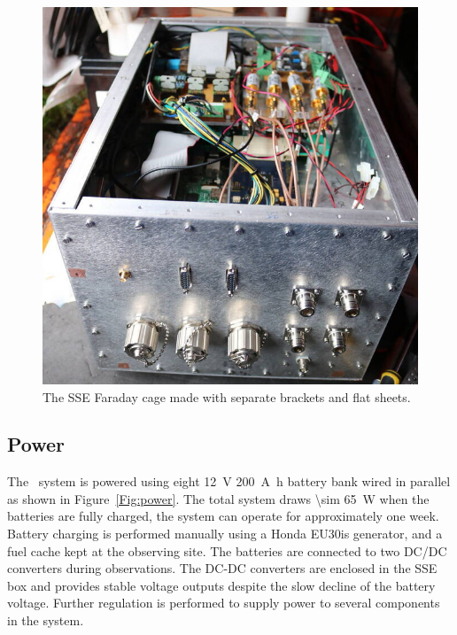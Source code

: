\begin{figure}
	\centering
	\includegraphics[width=0.4\linewidth]{Figures/47093285614_63bb00be20_o}
	\caption{The SSE Faraday cage made with separate brackets and flat sheets.}
	\label{Fig:47093285614_63bb00be20_o}
\end{figure}       

\subsection{Power}

The \prizm\ system is powered using eight \SI{12}{\volt} \SI{200}{\ampere \hour} battery bank wired in parallel as shown in Figure~\ref{Fig:power}. The total system draws \SI{\sim 65}{\watt} when the batteries are fully charged, the system can operate for approximately one week. Battery charging is performed manually using a Honda EU30is generator, and a fuel cache kept at the observing site. The batteries are connected to two DC/DC converters during observations. The DC-DC converters are enclosed in the SSE box and provides stable voltage outputs despite the slow decline of the battery voltage. Further regulation is performed to supply power to several components in the system.

